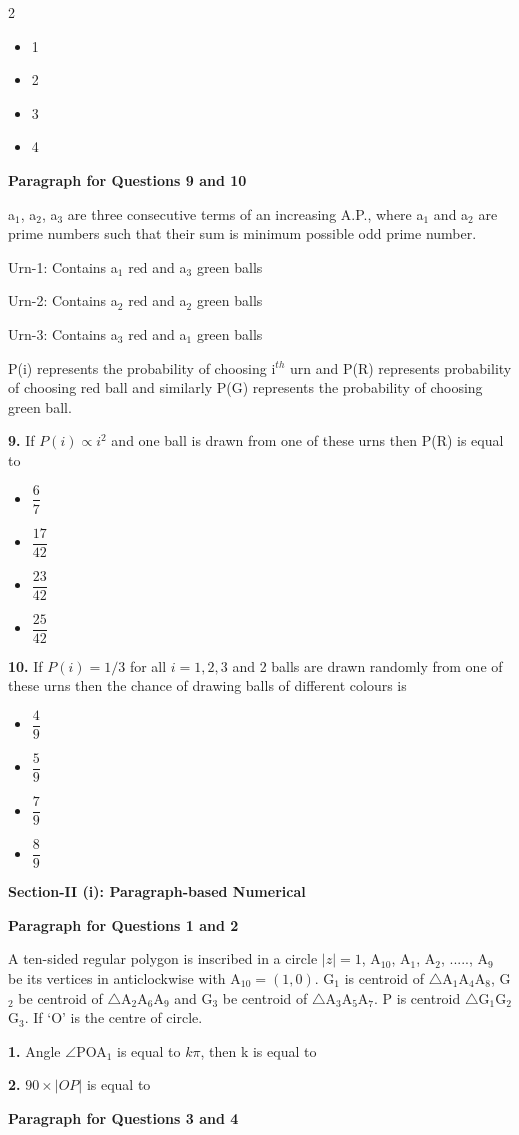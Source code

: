 \documentclass[10pt]{extarticle}
\newenvironment{qoptions}{\begin{itemize}[leftmargin=1.8em,itemsep=2pt,topsep=2pt,label={}]}{\end{itemize}}
\newcommand{\opt}[2]{\item[({#1})] {#2}}
\newcommand{\subsectionhdr}[1]{\par\vspace{3pt}\noindent\textbf{#1}\par\vspace{2pt}}
\begin{document}
\begin{multicols}{2}
\begin{qoptions}
\opt{A}{1}
\opt{B}{2}
\opt{C}{3}
\opt{D}{4}
\end{qoptions}

\textbf{Paragraph for Questions 9 and 10}

a$_1$, a$_2$, a$_3$ are three consecutive terms of an increasing A.P., where a$_1$ and a$_2$ are prime numbers such that their sum is minimum possible odd prime number.

Urn-1: Contains a$_1$ red and a$_3$ green balls

Urn-2: Contains a$_2$ red and a$_2$ green balls

Urn-3: Contains a$_3$ red and a$_1$ green balls

P(i) represents the probability of choosing i$^{th}$ urn and P(R) represents probability of choosing red ball and similarly P(G) represents the probability of choosing green ball.

\textbf{9.} If $P(i)\propto i^2$ and one ball is drawn from one of these urns then P(R) is equal to

\begin{qoptions}
\opt{A}{$\dfrac67$}
\opt{B}{$\dfrac{17}{42}$}
\opt{C}{$\dfrac{23}{42}$}
\opt{D}{$\dfrac{25}{42}$}
\end{qoptions}

\textbf{10.} If $P(i)=1/3$ for all $i=1,2,3$ and 2 balls are drawn randomly from one of these urns then the chance of drawing balls of different colours is

\begin{qoptions}
\opt{A}{$\dfrac49$}
\opt{B}{$\dfrac59$}
\opt{C}{$\dfrac79$}
\opt{D}{$\dfrac89$}
\end{qoptions}

\subsectionhdr{Section-II (i): Paragraph-based Numerical}

\textbf{Paragraph for Questions 1 and 2}

A ten-sided regular polygon is inscribed in a circle $|z|=1$, A$_{10}$, A$_1$, A$_2$, ....., A$_9$ be its vertices in anticlockwise with A$_{10}=(1,0)$. G$_1$ is centroid of $\triangle$A$_1$A$_4$A$_8$, G$_2$ be centroid of $\triangle$A$_2$A$_6$A$_9$ and G$_3$ be centroid of $\triangle$A$_3$A$_5$A$_7$. P is centroid $\triangle$G$_1$G$_2$G$_3$. If `O' is the centre of circle.

\textbf{1.} Angle $\angle$POA$_1$ is equal to $k\pi$, then k is equal to

\textbf{2.} $90\times|OP|$ is equal to

\textbf{Paragraph for Questions 3 and 4}


\end{multicols}
\end{document}
